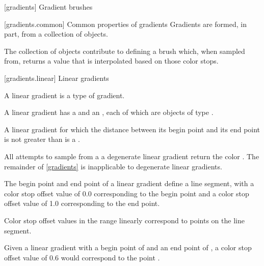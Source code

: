  [gradients] {Gradient brushes}

 [gradients.common] {Common properties of gradients}
\pnum
Gradients are formed, in part, from a collection of  objects.

\pnum
The collection of  objects contribute to defining a brush which, when sampled from, returns a value that is interpolated based on those color stops.

 [gradients.linear] {Linear gradients}

\pnum
A linear gradient is a type of gradient.

\pnum
A linear gradient has a  and an , each of which are objects of type .

\pnum
A linear gradient for which the distance between its begin point and its end point is not greater than  is a .

\pnum
All attempts to sample from a a degenerate linear gradient return the color . The remainder of \ref{gradients} is inapplicable to degenerate linear gradients.

\pnum
The begin point and end point of a linear gradient define a line segment, with a color stop offset value of 0.0 corresponding to the begin point and a color stop offset value of 1.0 corresponding to the end point.

\pnum
Color stop offset values in the range  linearly correspond to points on the line segment.

\pnum
\begin{example}
Given a linear gradient with a begin point of  and an end point of , a color stop offset value of 0.6 would correspond to the point .
\end{example}

